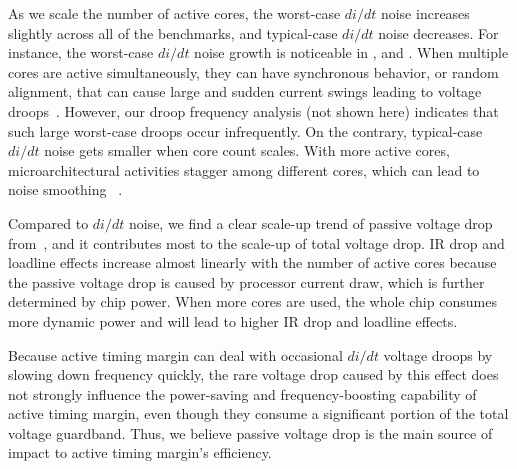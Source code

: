 As we scale the number of active cores, the worst-case $di/dt$ noise increases slightly across all of the benchmarks, and typical-case $di/dt$ noise decreases. For instance, the worst-case $di/dt$ noise growth is noticeable in ,  and . When multiple cores are active simultaneously, they can have synchronous behavior, or random alignment, that can cause large and sudden current swings leading to voltage droops~\cite{reddi2010voltage,miller2012vrsync,kim2012audit}. However, our droop frequency analysis (not shown here) indicates that such large worst-case droops occur infrequently. On the contrary, typical-case $di/dt$ noise gets smaller when core count scales. With more active cores, microarchitectural activities stagger among different cores, which can lead to noise smoothing ~\cite{miller2012vrsync,reddi2010voltage}.

Compared to $di/dt$ noise, we find a clear scale-up trend of passive voltage drop from~, and it contributes most to the scale-up of total voltage drop. IR drop and loadline effects increase almost linearly with the number of active cores because the passive voltage drop is caused by processor current draw, which is further determined by chip power. When more cores are used, the whole chip consumes more dynamic power and will lead to higher IR drop and loadline effects.

Because active timing margin can deal with occasional $di/dt$ voltage droops by slowing down frequency quickly, the rare voltage drop caused by this effect does not strongly influence the power-saving and frequency-boosting capability of active timing margin, even though they consume a significant portion of the total voltage guardband. Thus, we believe passive voltage drop is the main source of impact to active timing margin's efficiency. 

